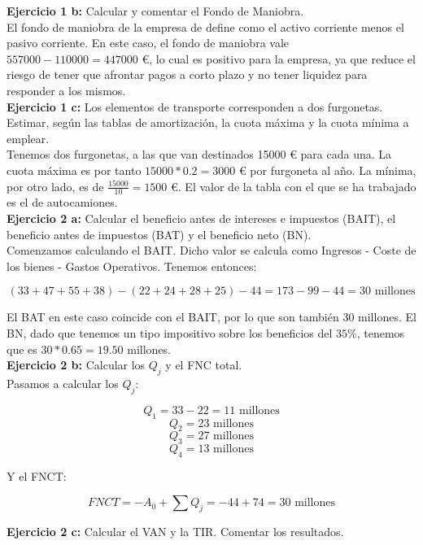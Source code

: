 \documentclass[11pt]{article}
\theoremstyle{plain}
\theoremstyle{definition}
\begin{document}
\textbf{Ejercicio 1 b:} Calcular y comentar el Fondo de Maniobra.\\

El fondo de maniobra de la empresa de define como el activo corriente
menos el pasivo corriente. En este caso, el fondo de maniobra vale
$557000 - 110000 = 447000$ €, lo cual es positivo para la empresa, ya
que reduce el riesgo de tener que afrontar pagos a corto plazo y no
tener liquidez para responder a los mismos.\\

\textbf{Ejercicio 1 c:} Los elementos de transporte corresponden a dos
furgonetas. Estimar, según las tablas de amortización, la cuota máxima
y la cuota mínima a emplear.\\

Tenemos dos furgonetas, a las que van destinados 15000 € para cada una.
La cuota máxima es por tanto $15000 * 0.2 = 3000$ € por furgoneta al
año. La mínima, por otro lado, es de $\frac{15000}{10} = 1500$ €.
El valor de la tabla con el que se ha trabajado es el de autocamiones.\\

\textbf{Ejercicio 2 a:} Calcular el beneficio antes de intereses e
impuestos (BAIT), el beneficio antes de impuestos (BAT) y el beneficio
neto (BN).\\

Comenzamos calculando el BAIT. Dicho valor se calcula como Ingresos -
Coste de los bienes - Gastos Operativos. Tenemos entonces:

\[
  (33 + 47 + 55 + 38) - (22 + 24 + 28 + 25) - 44 = 173 - 99 - 44 = 30
  \text{ millones}
\]

El BAT en este caso coincide con el BAIT, por lo que son también 30
millones.  El BN, dado que tenemos un tipo impositivo sobre los
beneficios del $35 \%$, tenemos que es $30 * 0.65 = 19.50$ millones.\\

\textbf{Ejercicio 2 b:} Calcular los $Q_j$ y el FNC total.\\

Pasamos a calcular los $Q_j$:

\[
  Q_1 = 33 - 22 = 11 \text{ millones}
\]
\[
  Q_2 = 23 \text{ millones}
\]
\[
  Q_3 = 27 \text{ millones}
\]
\[
  Q_4 = 13 \text{ millones}
\]

Y el FNCT:

\[
  FNCT = -A_0 + \sum Q_j = -44 + 74 = 30\text{ millones}
\]

\textbf{Ejercicio 2 c:} Calcular el VAN y la TIR. Comentar los
resultados.\\
\end{document}
